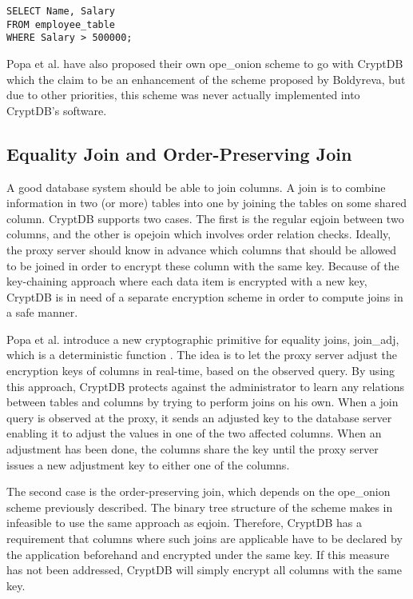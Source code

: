 \begin{verbatim}
SELECT Name, Salary
FROM employee_table
WHERE Salary > 500000;
\end{verbatim}

Popa et al. have also proposed their own \gls{ope_onion} scheme to go with CryptDB \cite{CryptDB_OPE_Encoding} which the claim to be an enhancement of the scheme proposed by Boldyreva, but due to other priorities, this scheme was never actually implemented into CryptDB's software.



\subsection{Equality Join and Order-Preserving Join}

A good database system should be able to join columns. A join is to combine information in two (or more) tables into one by joining the tables on some shared column. CryptDB supports two cases. The first is the regular \gls{eqjoin} between two columns, and the other is \gls{opejoin} which involves order relation checks. Ideally, the proxy server should know in advance which columns that should be allowed to be joined in order to encrypt these column with the same key. Because of the key-chaining approach where each data item is encrypted with a new key, CryptDB is in need of a separate encryption scheme in order to compute joins in a safe manner.

Popa et al. introduce a new cryptographic primitive for equality joins, \gls{join_adj}, which is a deterministic function \citep{CryptDB_Main_Paper}. The idea is to let the proxy server adjust the encryption keys of columns in real-time, based on the observed query. By using this approach, CryptDB protects against the administrator to learn any relations between tables and columns by trying to perform joins on his own. When a join query is observed at the proxy, it sends an adjusted key to the database server enabling it to adjust the values in one of the two affected columns. When an adjustment has been done, the columns share the key until the proxy server issues a new adjustment key to either one of the columns.

The second case is the order-preserving join, which depends on the \gls{ope_onion} scheme previously described. The binary tree structure of the scheme makes in infeasible to use the same approach as \gls{eqjoin}. Therefore, CryptDB has a requirement that columns where such joins are applicable have to be declared by the application beforehand and encrypted under the same key. If this measure has not been addressed, CryptDB will simply encrypt all columns with the same key.


